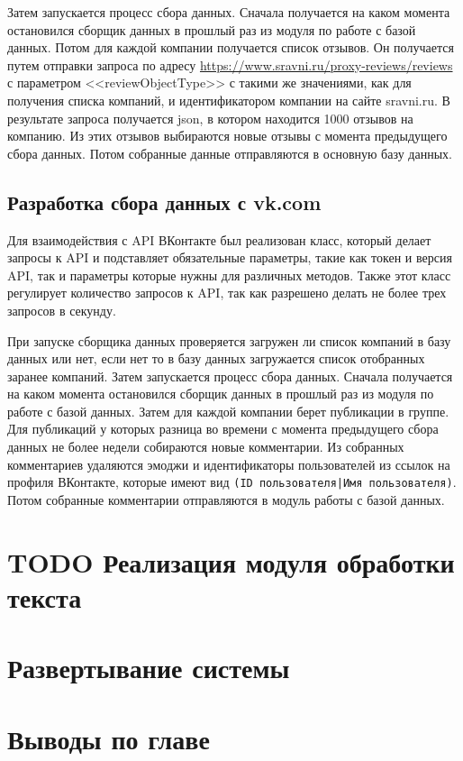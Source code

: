 \documentclass[PI, VKR]{HSEUniversity}
\begin{document}
Затем запускается процесс сбора данных. Сначала получается на каком момента остановился сборщик данных в прошлый раз из модуля по работе с базой данных. Потом для каждой компании получается список отзывов. Он получается путем отправки запроса по адресу \url{https://www.sravni.ru/proxy-reviews/reviews} с параметром {}<<reviewObjectType>>{} с такими же значениями, как для получения списка компаний, и идентификатором компании на сайте sravni.ru. В результате запроса получается json, в котором находится 1000 отзывов на компанию. Из этих отзывов выбираются новые отзывы с момента предыдущего сбора данных. Потом собранные данные отправляются в основную базу данных.
\subsection{Разработка сбора данных с vk.com}
\label{sec:orgf0fc5ea}
Для взаимодействия с API ВКонтакте был реализован класс, который делает запросы к API и подставляет обязательные параметры, такие как токен и версия API, так и параметры которые нужны для различных методов. Также этот класс регулирует количество запросов к API, так как разрешено делать не более трех запросов в секунду.

При запуске сборщика данных проверяется загружен ли список компаний в базу данных или нет, если нет то в базу данных загружается список отобранных заранее компаний. Затем запускается процесс сбора данных. Сначала получается на каком момента остановился сборщик данных в прошлый раз из модуля по работе с базой данных. Затем для каждой компании берет публикации в группе. Для публикаций у которых разница во времени с момента предыдущего сбора данных не более недели собираются новые комментарии. Из собранных комментариев удаляются эмоджи и идентификаторы пользователей из ссылок на профиля ВКонтакте, которые имеют вид \texttt{(ID пользователя|Имя пользователя)}. Потом собранные комментарии отправляются в модуль работы с базой данных.
\section{{\bfseries\sffamily TODO} Реализация модуля обработки текста}
\label{sec:orgdca38a6}
\section{Развертывание системы}
\label{sec:org87f1bf9}
\section{Выводы по главе}
\label{sec:org81e6c65}
\end{document}
